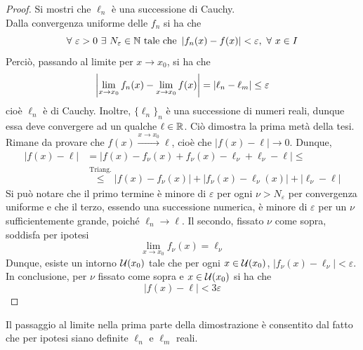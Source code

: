 \begin{proof}
    Si mostri che $\ell_n$ è una successione di Cauchy.\\
    Dalla convergenza uniforme delle $f_n$ si ha che
    \begin{equation*}
        \forall\ \varepsilon>0\ \exists\ N_\varepsilon \in \N\ \text{tale che}\ \left| \fn(x)-f(x)\right|< \varepsilon,\ \forall\ x \in I
    \end{equation*}
    Perciò, passando al limite per $x \to x_0$, si ha che
    \begin{equation*}
        \left| \lim_{x \to x_0}{f_n(x)}-\lim_{x \to x_0}{f(x)}\right| = \left| \ell_n - \ell_m \right| \leq \varepsilon
    \end{equation*}
    cioè $\ell_n$ è di Cauchy. Inoltre, $\{\ell_n\}_n$ è una successione di numeri reali, dunque essa deve convergere ad un qualche $\ell \in \mathbb{R}$. Ciò dimostra la prima metà della tesi.\\
    Rimane da provare che $f(x) \xrightarrow{x \to x_0} \ell$, cioè che $|f(x)-\ell| \to 0$. Dunque,
    \begin{equation*}
    \begin{aligned}
        \left|f(x)-\ell\right| &= \left| f(x) - f_\nu(x)+ f_\nu(x)- \ell_\nu+ \ell_\nu- \ell\right| \leq\\
        &\overset{\text{Triang.}}{\leq} \left| f(x) - f_\nu(x) \right| +\left| f_\nu(x)- \ell_\nu(x)\right|+\left|\ell_\nu-\ell\right|
    \end{aligned}
    \end{equation*}
    Si può notare che il primo termine è minore di $\varepsilon$ per ogni $\nu > N_\varepsilon$ per convergenza uniforme e che il terzo, essendo una successione numerica, è minore di $\varepsilon$ per un $\nu$ sufficientemente grande, poiché $\ell_n \to \ell$. Il secondo, fissato $\nu$ come sopra, soddisfa per ipotesi
    \begin{equation*}
        \lim_{x \to x_0}{f_\nu(x)} = \ell_\nu
    \end{equation*}
    Dunque, esiste un intorno $\mathcal{U}(x_0)$ tale che per ogni $x \in \mathcal{U}(x_0)$, $\left| f_\nu(x)- \ell_\nu \right| < \varepsilon$.\\
    In conclusione, per $\nu$ fissato come sopra e $x \in \mathcal{U}(x_0)$ si ha che
    \begin{equation*}
        \left|f(x)-\ell\right| < 3 \varepsilon
    \end{equation*}
\end{proof}
\begin{oss}
    Il passaggio al limite nella prima parte della dimostrazione è consentito dal fatto che per ipotesi siano definite $\ell_n$ e $\ell_m$ reali.
\end{oss}
